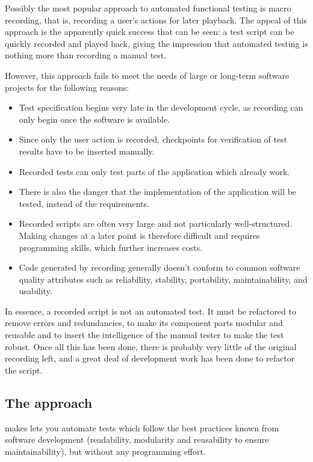 Possibly the most popular approach to automated functional testing is macro recording, that is, recording a user's actions for later playback.
The appeal of this approach is the apparently quick success that can be seen: a test script can be quickly recorded and played back, giving the impression that automated testing is nothing more than recording a manual test. 

However, this approach fails to meet the needs of large or long-term software projects for the following reasons:

\begin{itemize}
\item Test specification begins very late in the development cycle,
 as recording can only begin once the software is available. 
\item Since only the user action is recorded, checkpoints for verification
of test results have to be inserted manually.
\item Recorded tests can only test parts of the application which already work. \item There is also the danger that the implementation of the application will be tested, instead of the requirements. 
\item Recorded scripts are often very large and not particularly 
well-structured. Making changes at a later point is therefore 
difficult and requires programming skills, which further increases costs.  
\item Code generated by recording generally doesn't conform to
 common software quality attributes such as reliability, stability, 
portability, maintainability, and usability.
\end{itemize}

In essence, a recorded script is not an automated test. It must be refactored to remove errors and redundancies, to make its component parts modular and reusable and to insert the intelligence of the manual tester to make the test robust. Once all this has been done, there is probably very little of the original recording left, and a great deal of development work has been done to refactor the script.  


\subsection{The \app{} approach}
\label{JBApproach}
\app{} makes lets you automate tests which follow the best practices known from software development (readability, modularity and reusability to ensure maintainability), but without any programming effort. 


